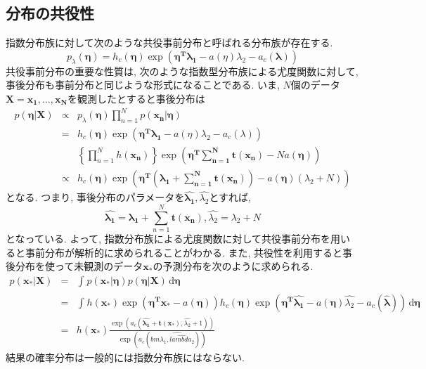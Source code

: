 \documentclass[twocolumn]{jarticle}
\begin{document}
\subsection{分布の共役性}
指数分布族に対して次のような共役事前分布と呼ばれる分布族が存在する.
\begin{equation}
  p_{\lambda}(\bm {\eta}) = h_c(\bm {\eta}) \exp(\bm {\eta^T \lambda_1} - a(\eta)\lambda_2 - a_c(\bm {\lambda}))
\end{equation}
共役事前分布の重要な性質は, 次のような指数型分布族による尤度関数に対して, 事後分布も事前分布と同じような形式になることである. いま, ${N}$個のデータ${\bm {X} = {\bm {x_1}, \ldots, \bm {x_N}}}$を観測したとすると事後分布は
\begin{eqnarray}
  p(\bm {\eta | X}) &\varpropto & p_\lambda(\bm {\eta})\prod_{n=1}^{N}p(\bm {x_n|\eta}) \nonumber \\
  &=& h_c (\bm {\eta})\exp(\bm {\eta^T\lambda_1} - a(\eta)\lambda_2 - a_c(\lambda)) \nonumber \\
  && \left\{\prod_{n=1}^{N} h(\bm {x_n})\right\} \exp\left(\bm {\eta^T \sum_{n=1}^{N}}\bm {t(x_n)} - Na(\bm {\eta})\right) \nonumber \\
  &\varpropto & h_c(\bm {\eta}) \exp\left(\bm {\eta^T}  \left(\bm {\lambda_1 + \sum_{n=1}^{N}\bm{t(x_n)}}\right) - a(\bm {\eta})(\lambda_2 + N)\right)
\end{eqnarray}
となる. つまり, 事後分布のパラメータを${\bm {\hat{\lambda_1}}, \hat{\lambda_2}}$とすれば,
\begin{equation}
  \bm {\hat{\lambda_1}} = \bm {\lambda_1} + \sum_{n=1}^{N} \bm{t(x_n)}, \hat{\lambda_2} = \lambda_2 + N
\end{equation}
となっている. よって, 指数分布族による尤度関数に対して共役事前分布を用いると事前分布が解析的に求められることがわかる.
また, 共役性を利用すると事後分布を使って未観測のデータ${\bm {x_\ast }}$の予測分布を次のように求められる.
\begin{eqnarray}
  p(\bm {x_\ast|X}) &=& \int_{}^{} p(\bm {x_\ast| \eta})p(\bm {\eta|X}) \,\mathrm{d}{\bm {\eta}} \nonumber \\
  &=& \int_{}^{} h(\bm {x_\ast}) \exp(\bm {\eta^T x_\ast} - a(\bm {\eta}))h_c(\bm {\eta})\exp(\bm {\eta^T \hat{\lambda_1}} - a(\bm {\eta}) \hat{\lambda_2} - a_c(\bm {\hat{\lambda}})) \,\mathrm{d}{\bm {\eta}} \nonumber \\
  &=& h(\bm {x_\ast}) \frac{\exp(a_c(\bm {\hat{\lambda_1}} + \bm {t(x_\ast)}, \hat{\lambda_2} + 1))}{\exp(a_c(bm{\hat{\lambda_1, \hat{lambda_2}}}))}
\end{eqnarray}
結果の確率分布は一般的には指数分布族にはならない.
\end{document}
